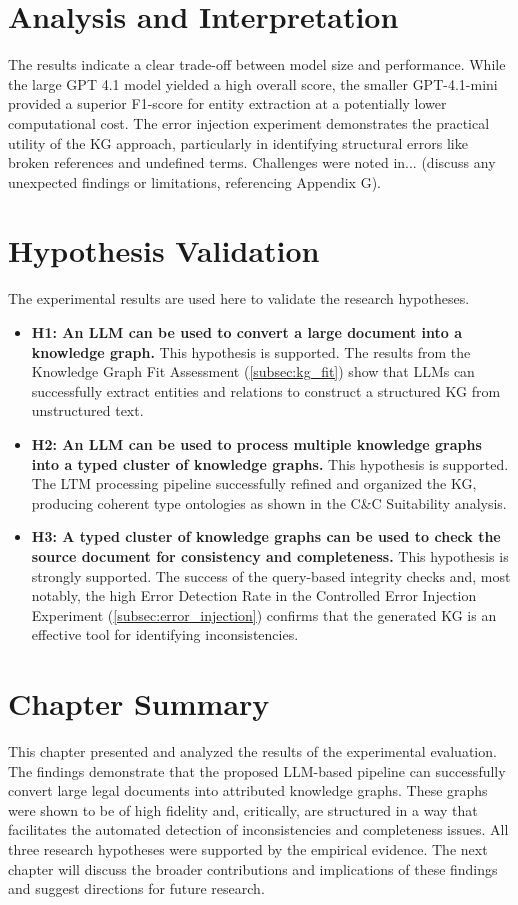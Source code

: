 \section{Analysis and Interpretation}
\label{sec:analysis}
The results indicate a clear trade-off between model size and performance. While the large GPT 4.1 model yielded a high overall score, the smaller GPT-4.1-mini provided a superior F1-score for entity extraction at a potentially lower computational cost. The error injection experiment demonstrates the practical utility of the KG approach, particularly in identifying structural errors like broken references and undefined terms. Challenges were noted in... (discuss any unexpected findings or limitations, referencing Appendix G).

\section{Hypothesis Validation}
\label{sec:hypothesis_validation}
The experimental results are used here to validate the research hypotheses.
\begin{itemize}
    \item \textbf{H1: An LLM can be used to convert a large document into a knowledge graph.} This hypothesis is supported. The results from the Knowledge Graph Fit Assessment (\cref{subsec:kg_fit}) show that LLMs can successfully extract entities and relations to construct a structured KG from unstructured text.
    \item \textbf{H2: An LLM can be used to process multiple knowledge graphs into a typed cluster of knowledge graphs.} This hypothesis is supported. The LTM processing pipeline successfully refined and organized the KG, producing coherent type ontologies as shown in the C\&C Suitability analysis.
    \item \textbf{H3: A typed cluster of knowledge graphs can be used to check the source document for consistency and completeness.} This hypothesis is strongly supported. The success of the query-based integrity checks and, most notably, the high Error Detection Rate in the Controlled Error Injection Experiment (\cref{subsec:error_injection}) confirms that the generated KG is an effective tool for identifying inconsistencies.
\end{itemize}

\section{Chapter Summary}
\label{sec:results_summary}
This chapter presented and analyzed the results of the experimental evaluation. The findings demonstrate that the proposed LLM-based pipeline can successfully convert large legal documents into attributed knowledge graphs. These graphs were shown to be of high fidelity and, critically, are structured in a way that facilitates the automated detection of inconsistencies and completeness issues. All three research hypotheses were supported by the empirical evidence. The next chapter will discuss the broader contributions and implications of these findings and suggest directions for future research.